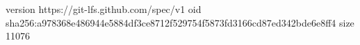 version https://git-lfs.github.com/spec/v1
oid sha256:a978368e486944e5884df3ce8712f529754f5873fd3166cd87ed342bde6e8ff4
size 11076
